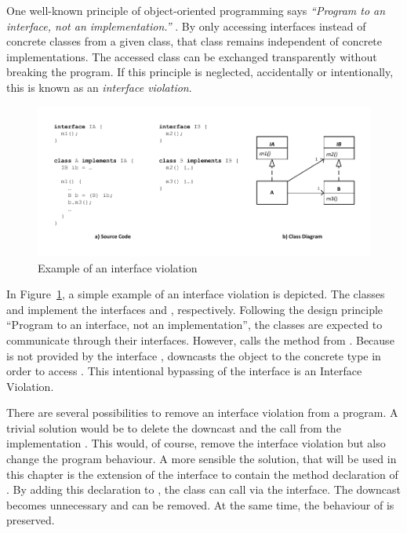 One well-known principle of object-oriented programming says \emph{``Program to an interface, not an implementation.''} \cite{GHJV95}. By only accessing interfaces instead of concrete classes from a given class, that class remains independent of concrete implementations. The accessed class can be exchanged transparently without breaking the program. If this principle is neglected, accidentally or intentionally, this is known as an \emph{interface violation}.

\begin{figure}[hbtp]
\centering
\includegraphics[width=\linewidth]{./figures/InterfaceViolation}
\caption{Example of an interface violation}
\label{fig:InterfaceViolationExample}
\end{figure}

In Figure~\ref{fig:InterfaceViolationExample}, a simple example of an interface violation is depicted. The classes  and  implement the interfaces  and , respectively. Following the design principle ``Program to an interface, not an implementation'', the classes are expected to communicate through their interfaces. However,  calls the method  from . Because  is not provided by the interface ,  downcasts the object  to the concrete type  in order to access . This intentional bypassing of the interface  is an Interface Violation.

There are several possibilities to remove an interface violation from a program. A trivial solution would be to delete the downcast and the call from the implementation . This would, of course, remove the interface violation but also change the program behaviour. A more sensible the solution, that will be used in this chapter is the extension of the interface  to contain the method declaration of . By adding this declaration to , the class  can call  via the interface. The downcast becomes unnecessary and can be removed. At the same time, the behaviour of  is preserved.

